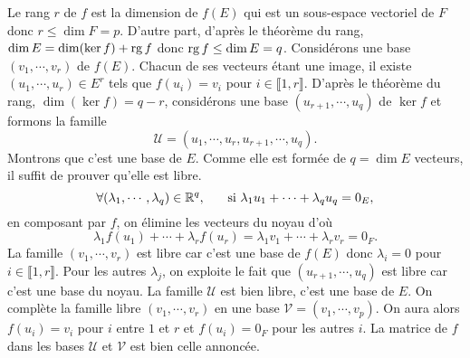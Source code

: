 \begin{demo}
 Le rang $r$ de $f$ est la dimension de $f(E)$ qui est un sous-espace vectoriel de $F$ donc $r\leq \dim F = p$. 
 D'autre part, d'après le théorème du rang, $\dim E=\dim(\ker f) + \mathop{\mathrm{rg}} f$ donc $\mathop{\mathrm{rg}} f\leq \dim E = q$.\newline
Considérons une base $(v_1,\cdots,v_r)$ de $f(E)$.\newline
Chacun de ses vecteurs étant une image, il existe $(u_1,\cdots,u_r) \in E^r$ tels que $f(u_i)=v_i$ pour $i \in \llbracket 1, r\rrbracket$. D'après le théorème du rang, $\dim(\ker f) = q-r$, considérons une base $(u_{r+1},\cdots,u_q)$ de $\ker f$ et formons la famille
\begin{displaymath}
 \mathcal U = (u_1,\cdots ,u_r,u_{r+1},\cdots,u_q).
\end{displaymath}
Montrons que c'est une base de $E$.\newline
Comme elle est formée de $q=\dim E$ vecteurs, il suffit de prouver qu'elle est libre.
\[
\forall (\lambda_1,\cdots,\lambda_q) \in \mathbb{R}^q,\hspace{0.5cm} \text{ si } \lambda_1 u_1 +\cdots +\lambda_q u_q = 0_E,                                                                                                                                                    
\]
en composant par $f$, on élimine les vecteurs du noyau d'où
\begin{displaymath}
\lambda_1 f(u_1) + \cdots +\lambda_r f(u_r) = \lambda_1 v_1 +\cdots +\lambda_r v_r = 0_F   .                                                                                                                                                          
\end{displaymath}
La famille $(v_1,\cdots,v_r)$ est libre car c'est une base de $f(E)$ donc $\lambda_i = 0$ pour $i \in \llbracket 1, r\rrbracket$.\newline
Pour les autres $\lambda_j$, on exploite le fait que $(u_{r+1},\cdots,u_q)$ est libre car c'est une base du noyau.\newline
La famille $\mathcal{U}$ est bien libre, c'est une base de $E$.\newline
On complète la famille libre $(v_1,\cdots,v_r)$ en une base $\mathcal{V} = (v_1,\cdots,v_p)$.\newline
On aura alors $f(u_i)=v_i$ pour $i$ entre $1$ et $r$ et $f(u_i)=0_F$ pour les autres $i$. La matrice de $f$ dans les bases $\mathcal{U}$ et $\mathcal{V}$ est bien celle annoncée.
\end{demo}


